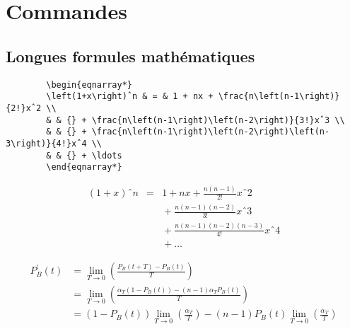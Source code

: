 \documentclass[11pt,a4paper]{article}
\begin{document}
	\section{Commandes}
	
	\subsection{Longues formules mathématiques}
	\begin{verbatim}
		\begin{eqnarray*}
		\left(1+x\right)ˆn & = & 1 + nx + \frac{n\left(n-1\right)}{2!}xˆ2 \\
		& & {} + \frac{n\left(n-1\right)\left(n-2\right)}{3!}xˆ3 \\
		& & {} + \frac{n\left(n-1\right)\left(n-2\right)\left(n-3\right)}{4!}xˆ4 \\
		& & {} + \ldots
		\end{eqnarray*}

	\end{verbatim}
	\begin{eqnarray*}
		\left(1+x\right)ˆn & = & 1 + nx + \frac{n\left(n-1\right)}{2!}xˆ2 \\
		& & {} + \frac{n\left(n-1\right)\left(n-2\right)}{3!}xˆ3 \\
		& & {} + \frac{n\left(n-1\right)\left(n-2\right)\left(n-3\right)}{4!}xˆ4 \\
		& & {} + \ldots
	\end{eqnarray*}

	\newpage
	
	\begin{align*}
	P^{\prime}_{B}(t) &= \lim\limits_{T \to 0}\left(\frac{P_{B}(t + T) - P_{B}(t)}{T}\right)\\
	&= \lim\limits_{T \to 0}\left(\frac{\alpha_{T}(1 - P_{B}(t)) - (n - 1)\alpha_{T}P_{B}(t)}{T}\right)\\
	&= (1 - P_{B}(t)) \lim\limits_{T \to 0}\left(\frac{\alpha_{T}}{T}\right) - (n - 1) P_{B}(t)\lim\limits_{T \to 0}\left(\frac{\alpha_{T}}{T}\right)\\
	\end{align*}
	
\end{document}
